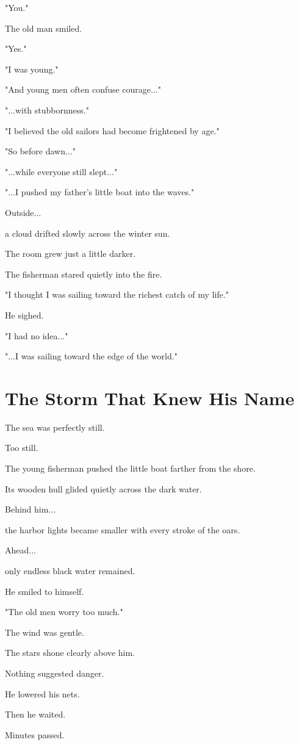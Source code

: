 \documentclass[12pt,openany]{book}
\begin{document}
"You."

The old man smiled.

"Yes."

"I was young."

"And young men often confuse courage..."

"...with stubbornness."

"I believed the old sailors had become frightened by age."

"So before dawn..."

"...while everyone still slept..."

"...I pushed my father's little boat into the waves."

Outside...

a cloud drifted slowly across the winter sun.

The room grew just a little darker.

The fisherman stared quietly into the fire.

"I thought I was sailing toward the richest catch of my life."

He sighed.

"I had no idea..."

"...I was sailing toward the edge of the world."
\section*{The Storm That Knew His Name}

The sea was perfectly still.

Too still.

The young fisherman pushed the little boat farther from the shore.

Its wooden hull glided quietly across the dark water.

Behind him...

the harbor lights became smaller with every stroke of the oars.

Ahead...

only endless black water remained.

He smiled to himself.

"The old men worry too much."

The wind was gentle.

The stars shone clearly above him.

Nothing suggested danger.

He lowered his nets.

Then he waited.

Minutes passed.
\end{document}

